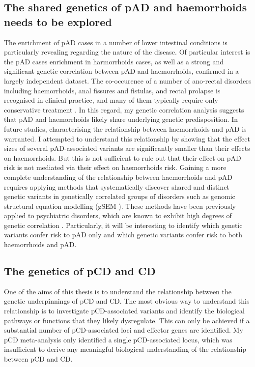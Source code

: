 \subsection{The shared genetics of pAD and haemorrhoids needs to be explored}

The enrichment of pAD cases in a number of lower intestinal conditions is particularly revealing regarding the nature of the disease. Of particular interest is the pAD cases enrichment in harmorrhoids cases, as well as a strong and significant genetic correlation between pAD and haemorrhoids, confirmed in a largely independent dataset. The co-occurence of a number of ano-rectal disorders including haemorrhoids, anal fissures and fistulas, and rectal prolapse is recognised in clinical practice, and many of them typically require only conservative treatment \cite{Felt-Bersma2009-am,Foxx-Orenstein2014-el}. In this regard, my genetic correlation analysis suggests that pAD and haemorrhoids likely share underlying genetic predisposition. In future studies, characterising the relationship between haemorrhoids and pAD is warranted. I attempted to understand this relationship by showing that the effect sizes of several pAD-associated variants are significantly smaller than their effects on haemorrhoids. But this is not sufficient to rule out that their effect on pAD risk is not mediated via their effect on haemorrhoids risk. Gaining a more complete understanding of the relationship between haemorrhoids and pAD requires applying methods that systematically discover shared and distinct genetic variants in genetically correlated groups of disorders such as genomic structural equation modelling (gSEM \cite{Grotzinger2019-bt}). These methods have been previously applied to psychiatric disorders, which are known to exhibit high degrees of genetic correlation \cite{Grotzinger2022-ak}. Particularly, it will be interesting to identify which genetic variants confer risk to pAD only and which genetic variants confer risk to both haemorrhoids and pAD. 

\subsection{The genetics of pCD and CD}
One of the aims of this thesis is to understand the relationship between the genetic underpinnings of pCD and CD. The most obvious way to understand this relationship is to investigate pCD-associated variants and identify the biological pathways or functions that they likely dysregulate. This can only be achieved if a substantial number of pCD-associated loci and effector genes are identified. My pCD meta-analysis only identified a single pCD-associated locus, which was insufficient to derive any meaningful biological understanding of the relationship between pCD and CD.\\

